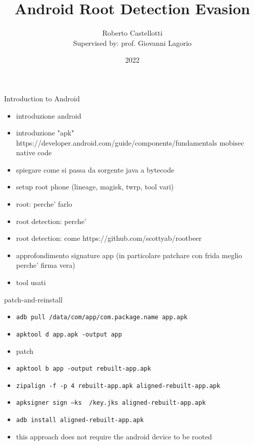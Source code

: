 \documentclass{beamer}
\title{Android Root Detection Evasion}
\author[]{Roberto Castellotti\\{\small Supervised by: prof. Giovanni Lagorio}}
\institute{Università degli Studi di Genova}
\date{2022}
\begin{document}
\makeatletter

\frame{\titlepage}

\begin{frame}{Introduction to Android}

\begin{itemize}
    \item introduzione android
    \item introduzione "apk" https://developer.android.com/guide/components/fundamentals mobisec native code
    \item spiegare come si passa da sorgente java a bytecode
    \item setup root phone (lineage, magisk, twrp, tool vari)
    \item root: perche' farlo
    \item root detection: perche'
    \item root detection: come https://github.com/scottyab/rootbeer
    \item approfondimento signature app (in particolare patchare con frida meglio perche' firma vera)
    \item tool usati
\end{itemize}

\end{frame}


\begin{frame}{patch-and-reinstall}

    \begin{itemize}
        \item {\footnotesize \texttt{adb pull /data/com/app/com.package.name app.apk}}
        \item {\footnotesize \texttt{apktool d app.apk -output app}}
        \item patch
        \item {\footnotesize \texttt{apktool b app -output rebuilt-app.apk}}
        \item {\footnotesize \texttt{zipalign -f -p 4 rebuilt-app.apk  aligned-rebuilt-app.apk}}
        \item {\footnotesize \texttt{apksigner sign --ks ~/key.jks  aligned-rebuilt-app.apk}}
        \item {\footnotesize \texttt{adb install aligned-rebuilt-app.apk}}
        \item this approach does not require the android device to be rooted 
    \end{itemize}

\end{frame}
\end{document}
